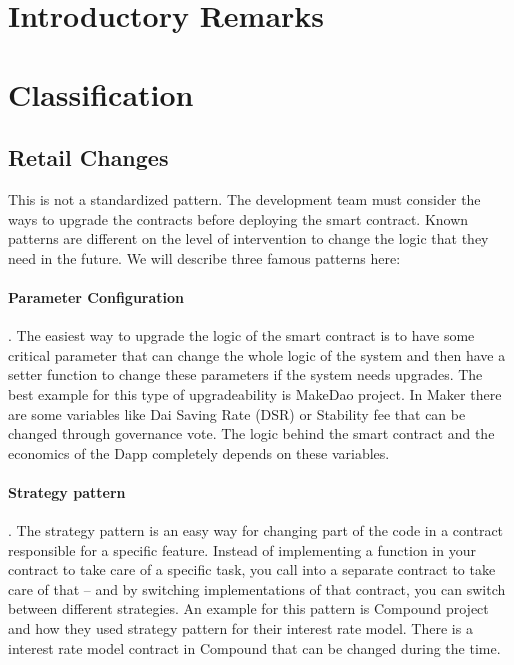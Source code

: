 

\section{Introductory Remarks}



\section{Classification}

\subsection{Retail Changes}
This is not a standardized pattern. The development team must consider the ways to upgrade the contracts before deploying the smart contract. Known patterns are different on the level of intervention to change the logic that they need in the future. We will describe three famous patterns here:

\paragraph{Parameter Configuration}. The easiest way to upgrade the logic of the smart contract is to have some critical parameter that can change the whole logic of the system and then have a setter function to change these parameters if the system needs upgrades. The best example for this type of upgradeability is MakeDao project. In Maker there are some variables like Dai Saving Rate (DSR) or Stability fee that can be changed through governance vote. The logic behind the smart contract and the economics of the Dapp completely depends on these variables.

\paragraph{Strategy pattern}. The strategy pattern is an easy way for changing part of the code in a contract responsible for a specific feature. Instead of implementing a function in your contract to take care of a specific task, you call into a separate contract to take care of that – and by switching implementations of that contract, you can switch between different strategies.
An example for this pattern is Compound project and how they used strategy pattern for their interest rate model. There is a interest rate model contract in Compound that can be changed during the time. 

